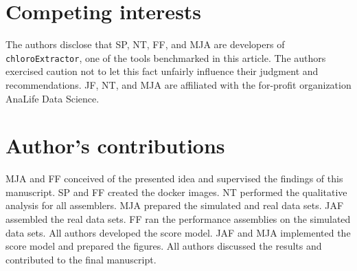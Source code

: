 \documentclass{bmcart}
\newcommand{\formatprogramnames}[1]{\texttt{#1}}
\newcommand{\ce}{\formatprogramnames{chloroExtractor}}
\begin{document}

\begin{backmatter}

\section*{Competing interests}
The authors disclose that SP, NT, FF, and MJA are developers of \ce{}, one of the tools benchmarked in this article.
The authors exercised caution not to let this fact unfairly influence their judgment and recommendations.
JF, NT, and MJA are affiliated with the for-profit organization AnaLife Data Science.

\section*{Author's contributions}
MJA and FF conceived of the presented idea and supervised the findings of this manuscript.
SP and FF created the docker images.
NT performed the qualitative analysis for all assemblers.
MJA prepared the simulated and real data sets.
JAF assembled the real data sets.
FF ran the performance assemblies on the simulated data sets.
All authors developed the score model.
JAF and MJA implemented the score model and prepared the figures.
All authors discussed the results and contributed to the final manuscript.



\end{backmatter}
\end{document}
